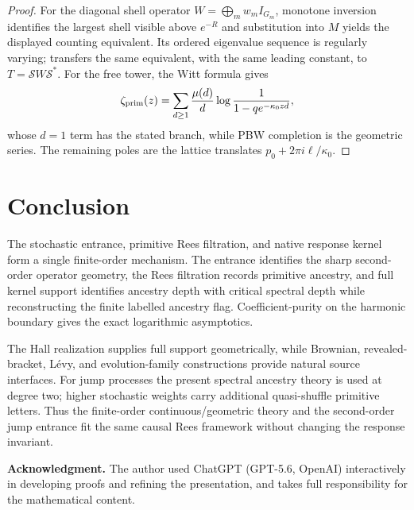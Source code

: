 \documentclass[10pt,reqno]{amsart}
\theoremstyle{plain}
\theoremstyle{definition}
\theoremstyle{remark}
\begin{document}
\begin{proof}
For the diagonal shell operator
$W=\bigoplus_m w_mI_{G_m}$, monotone inversion identifies the largest shell
visible above $e^{-R}$ and substitution into $M$ yields the displayed
counting equivalent.  Its ordered eigenvalue sequence is regularly varying;
 transfers the same equivalent, with
the same leading constant, to
$T=\mathscr S W\mathscr S^*$.  For the free tower, the Witt formula gives
\[
 \zeta_{\rm prim}(z)
 =\sum_{d\ge1}\frac{\mu(d)}d
  \log\frac1{1-qe^{-\kappa_0zd}},
\]
whose $d=1$ term has the stated branch, while PBW completion is the geometric
series.  The remaining poles are the lattice translates
$p_0+2\pi i\ell/\kappa_0$.
\end{proof}

\section{Conclusion}
\label{sec:scope-conclusion}

The stochastic entrance, primitive Rees filtration, and native response kernel
form a single finite-order mechanism.  The entrance identifies the sharp
second-order operator geometry, the Rees filtration records primitive ancestry,
and full kernel support identifies ancestry depth with critical spectral depth
while reconstructing the finite labelled ancestry flag.  Coefficient-purity on
the harmonic boundary gives the exact logarithmic asymptotics.

The Hall realization supplies full support geometrically, while Brownian,
revealed-bracket, L\'evy, and evolution-family constructions provide natural
source interfaces.  For jump processes the present spectral ancestry theory is
used at degree two; higher stochastic weights carry additional quasi-shuffle
primitive letters.  Thus the finite-order continuous/geometric theory and the
second-order jump entrance fit the same causal Rees framework without changing
the response invariant.

\medskip
\noindent\textbf{Acknowledgment.}
The author used ChatGPT (GPT-5.6, OpenAI) interactively in developing proofs
and refining the presentation, and takes full responsibility for the
mathematical content.
\end{document}
